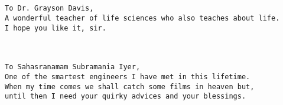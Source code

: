 \begin{minipage}{4in}

\begin{verbatim}


To Dr. Grayson Davis,
A wonderful teacher of life sciences who also teaches about life.
I hope you like it, sir.



To Sahasranamam Subramania Iyer,
One of the smartest engineers I have met in this lifetime.
When my time comes we shall catch some films in heaven but,
until then I need your quirky advices and your blessings.

\end{verbatim}


\end{minipage}
